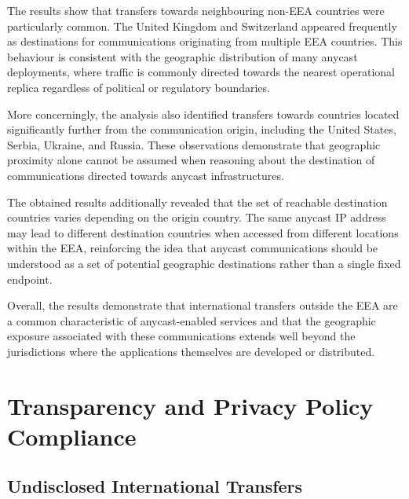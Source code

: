 The results show that transfers towards neighbouring non-EEA countries were particularly common. The United Kingdom and Switzerland appeared frequently as destinations for communications originating from multiple EEA countries. This behaviour is consistent with the geographic distribution of many anycast deployments, where traffic is commonly directed towards the nearest operational replica regardless of political or regulatory boundaries.

More concerningly, the analysis also identified transfers towards countries located significantly further from the communication origin, including the United States, Serbia, Ukraine, and Russia. These observations demonstrate that geographic proximity alone cannot be assumed when reasoning about the destination of communications directed towards anycast infrastructures.

The obtained results additionally revealed that the set of reachable destination countries varies depending on the origin country. The same anycast IP address may lead to different destination countries when accessed from different locations within the EEA, reinforcing the idea that anycast communications should be understood as a set of potential geographic destinations rather than a single fixed endpoint.

Overall, the results demonstrate that international transfers outside the EEA are a common characteristic of anycast-enabled services and that the geographic exposure associated with these communications extends well beyond the jurisdictions where the applications themselves are developed or distributed.

\section{Transparency and Privacy Policy Compliance}
\label{sc:anycast_experiments_transparency}

\subsection{Undisclosed International Transfers}
\label{sc:anycast_experiments_undisclosed}


